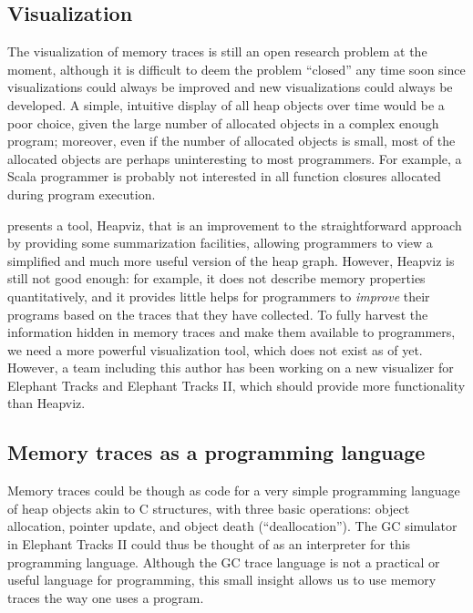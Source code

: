 \subsection{Visualization}
The visualization of memory traces is still an open research problem at the moment, although it is difficult to deem the problem ``closed''
any time soon since visualizations could always be improved and new visualizations could always be developed. A simple, intuitive display of
all heap objects over time would be a poor choice, given the large number of allocated objects in a complex enough program; moreover, even if
the number of allocated objects is small, most of the allocated objects are perhaps uninteresting to most programmers. For example, a Scala
programmer is probably not interested in all function closures allocated during program execution.

\cite{Heapviz} presents a tool, Heapviz, that is an improvement to the straightforward approach by providing some summarization facilities,
allowing programmers to view a simplified and much more useful version of the heap graph. However, Heapviz is still not good enough: for example,
it does not describe memory properties quantitatively, and it provides little helps for programmers to \emph{improve} their programs based on
the traces that they have collected. To fully harvest the information hidden in memory traces and make them available to programmers, we need a
more powerful visualization tool, which does not exist as of yet. However, a team including this author has been working on a new visualizer for
Elephant Tracks and Elephant Tracks II, which should provide more functionality than Heapviz.

\subsection{Memory traces as a programming language}
Memory traces could be though as code for a very simple programming language of heap objects akin to C structures, with three basic operations:
object allocation, pointer update, and object death (``deallocation''). The GC simulator in Elephant Tracks II could thus be thought of as an
interpreter for this programming language. Although the GC trace language is not a practical or useful language for programming, this small insight
allows us to use memory traces the way one uses a program.

